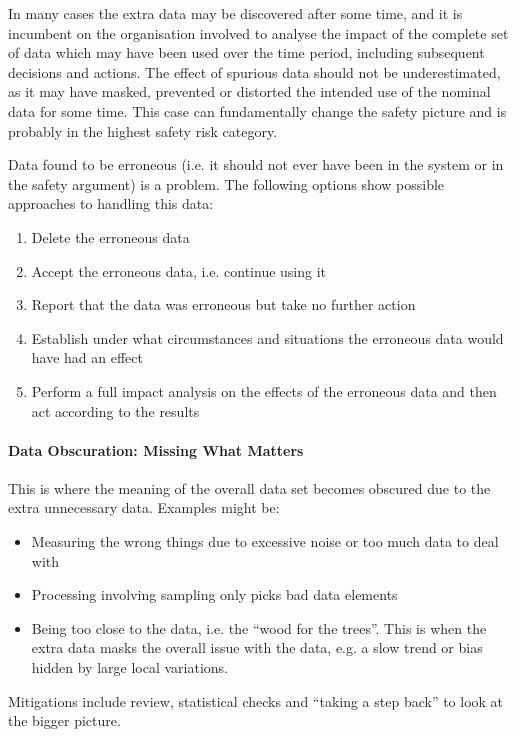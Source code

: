In many cases the extra data may be discovered after some time, and it is incumbent on the organisation involved to analyse the impact of the complete set of data which may have been used over the time period, including subsequent decisions and actions. The effect of spurious data should not be underestimated, as it may have masked, prevented or distorted the intended use of the nominal data for some time. This case can fundamentally change the safety picture and is probably in the highest safety risk category.

Data found to be erroneous (i.e. it should not ever have been in the system or in the safety argument) is a problem. The following options show possible approaches to handling this data:
\begin{enumerate}[label=\color{dsiwgAccentColour}\roman*)]
    \item Delete the erroneous data
    \item Accept the erroneous data, i.e. continue using it
    \item Report that the data was erroneous but take no further action 
    \item Establish under what circumstances and situations the erroneous data would have had an effect
    \item Perform a full impact analysis on the effects of the erroneous data and then act according to the results
\end{enumerate}

\paragraph{Data Obscuration: Missing What Matters}
This is where the meaning of the overall data set becomes obscured due to the extra unnecessary data. Examples might be:
\begin{itemize}
    \item Measuring the wrong things due to excessive noise or too much data to deal with
    \item Processing involving sampling only picks bad data elements
    \item Being too close to the data, i.e. the ``wood for the trees''. This is when the extra data masks the overall issue with the data, e.g. a slow trend or bias hidden by large local variations.
\end{itemize}

Mitigations include review, statistical checks and ``taking a step back'' to look at the bigger picture.
